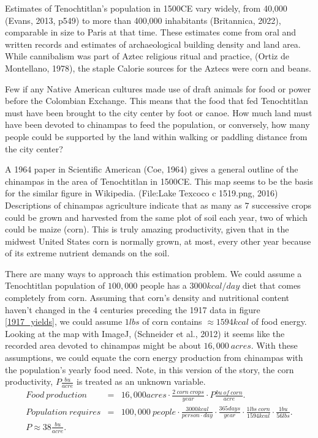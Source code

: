 \documentclass[man]{apa7}
\newcommand{\bea}{\begin{eqnarray}}
\newcommand{\eea}{\end{eqnarray}}
\begin{document}
Estimates of Tenochtitlan's population in 1500CE vary widely, from 40,000
(Evans, 2013, p549)
to more than 400,000 inhabitants (Britannica, 2022), comparable in size to Paris at that time. These estimates come from oral and written records and estimates of archaeological building density and land area.   While cannibalism was part of Aztec religious ritual and practice,
(Ortiz de Montellano, 1978), the staple Calorie sources for the Aztecs were corn and beans.

Few if any Native American cultures made use of draft animals for food or power before the Colombian Exchange.  This means that the food that fed Tenochtitlan must have been brought to the city center by foot or canoe.  How much land must have been devoted to chinampas to feed the population, or conversely, how many people could be supported by the land within walking or paddling distance from the city center?

A 1964 paper in Scientific American (Coe, 1964) gives a general outline of the chinampas in the area of Tenochtitlan in 1500CE.  This map seems to be the basis for the similar figure in Wikipedia. (File:Lake Texcoco c 1519.png, 2016)
Descriptions of chinampas agriculture indicate that as many as $7$ successive crops could be grown and harvested from the same plot of soil each year, two of which could be maize (corn).  This is truly amazing productivity, given that in the midwest United States corn is normally grown, at most, every other year because of its extreme nutrient demands on the soil.

There are many ways to approach this estimation problem.  We could assume a Tenochtitlan population of $100,000$ people has a $3000kcal/day$ diet that comes completely from corn.  Assuming that corn's density and nutritional content haven't changed in the $4$ centuries preceding the 1917 data in figure \ref{1917_yields}, we could assume $1lbs$ of corn contains $\approx1594kcal$ of food energy.  
Looking at the map with ImageJ, (Schneider et al., 2012) it seems like the recorded area devoted to chinampas might be about $16,000~acres$.
With these assumptions, we could equate the corn energy production from chinampas with the population's yearly food need. Note, in this version of the story, the corn productivity, $P\frac{bu}{acre}$ is treated as an unknown variable.  
\bea
Food~production &=& 16,000acres\cdot \frac{2~corn~crops}{year}\cdot P \frac{bu~of~corn}{acre} . \\
Population~requires &=& 100,000~people\cdot \frac{3000kcal}{person\cdot day}\cdot\frac{365days}{year}\cdot\frac{1lbs~corn}{1594kcal}\cdot\frac{1bu}{56lbs} . \\
P \approx 38\frac{bu}{acre} . && 
\eea
\end{document}
